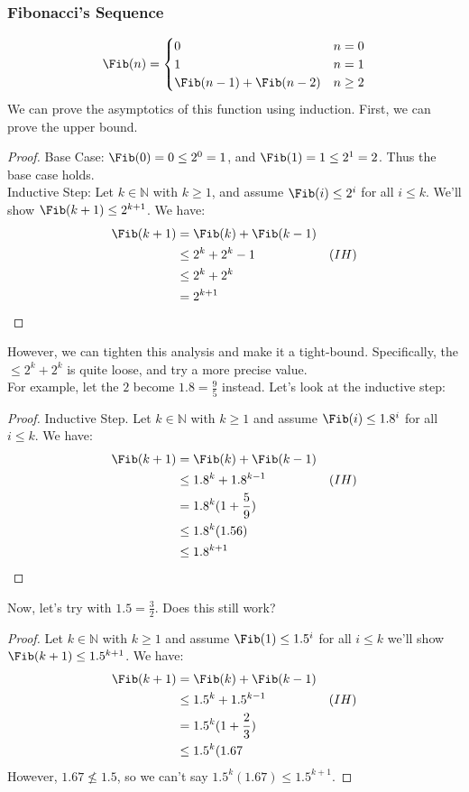 \documentclass{article}
\begin{document}
\subsubsection{Fibonacci's Sequence}
$$\Fib(n) = \begin{cases}
0 & n = 0\\
1 & n = 1\\
\Fib(n - 1) + \Fib(n - 2) & n \geq 2
\end{cases}$$
We can prove the asymptotics of this function using induction. First, we can prove the upper bound.
\begin{proof}
Base Case: $\Fib(0) = 0 \leq 2^0 = 1$, and $\Fib(1) = 1 \leq 2^1 = 2$. Thus the base case holds.\\
Inductive Step: Let $k \in \mathbb{N}$ with $k \geq 1$, and assume $\Fib(i) \leq 2^i$ for all $i \leq k$. We'll show $\Fib(k + 1) \leq 2^{k + 1}$. We have:
\begin{align*}
    \Fib(k + 1) & = \Fib(k) + \Fib(k - 1)\\
    & \leq 2^k + 2^k - 1 & (IH)\\
    & \leq 2^k + 2^k\\
    & = 2^{k + 1}
\end{align*}
\end{proof}
However, we can tighten this analysis and make it a tight-bound. Specifically, the $\leq 2^k + 2^k$ is quite loose, and try a more precise value.\\
For example, let the $2$ become $1.8 = \frac{9}{5}$ instead. Let's look at the inductive step:
\begin{proof}
Inductive Step. Let $k \in \mathbb{N}$ with $k \geq 1$ and assume $\Fib(i) \leq 1.8^i$ for all $i \leq k$. We have:
\begin{align*}
    \Fib(k + 1) & = \Fib(k) + \Fib(k - 1)\\
    & \leq 1.8^k + 1.8^{k - 1} & (IH)\\
    & = 1.8^k(1 + \frac{5}{9})\\
    & \leq 1.8^k(1.56)\\
    & \leq 1.8^{k + 1}
\end{align*}
\end{proof}
Now, let's try with $1.5 = \frac{3}{2}$. Does this still work?
\begin{proof}
Let $k \in \mathbb{N}$ with $k \geq 1$ and assume $\Fib(1) \leq 1.5^i$ for all $i \leq k$ we'll show $\Fib(k + 1) \leq 1.5^{k + 1}$. We have:
\begin{align*}
    \Fib(k + 1) & = \Fib(k) + \Fib(k - 1)\\
    & \leq 1.5^k + 1.5^{k - 1} & (IH)\\
    & = 1.5^k(1 + \frac{2}{3})\\
    & \leq 1.5^k(1.67
\end{align*}
However, $1.67 \not \leq 1.5$, so we can't say $1.5^k(1.67) \leq 1.5^{k + 1}$.
\end{proof}
\end{document}
